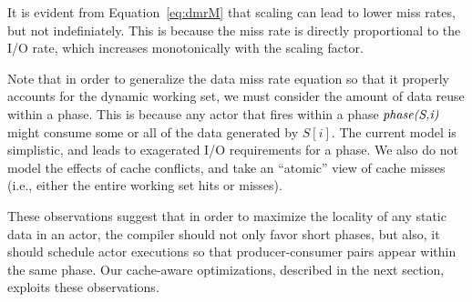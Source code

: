 It is evident from Equation~\ref{eq:dmrM} that scaling can lead
to lower miss rates, but not indefiniately. This is because the miss
rate is directly proportional to the I/O rate, which increases
monotonically with the scaling factor.

Note that in order to generalize the data miss rate equation so that it properly
accounts for the dynamic working set, we must consider the amount of
data reuse within a phase. This is because any actor that fires within
a phase $\mbox{\it phase(S,i)}$ might consume some or all of the data
generated by $S[i]$. The current model is simplistic, and leads to
exagerated I/O requirements for a phase. We also do not model the
effects of cache conflicts, and take an ``atomic'' view of cache
misses (i.e., either the entire working set hits or misses).

These observations suggest that in order to maximize the locality of
any static data in an actor, the compiler should not only favor short
phases, but also, it should schedule actor executions so that
producer-consumer pairs appear within the same phase. Our cache-aware
optimizations, described in the next section, exploits these
observations. 